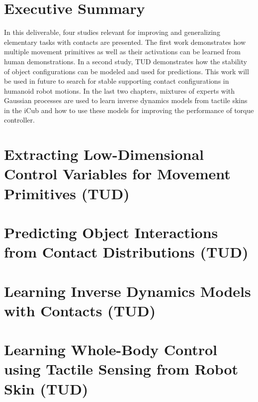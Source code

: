 \documentclass[12pt,a4paper,twoside]{report}
\begin{document}
\chapter{Executive Summary}

In this deliverable, four studies relevant for improving and generalizing
elementary tasks with contacts are presented. The first work demonstrates how
multiple movement primitives as well as their activations can be learned from
human demonstrations. In a second study, TUD demonstrates how the stability of
object configurations can be modeled and used for predictions. This work will be
used in future to search for stable supporting contact configurations in
humanoid robot motions. In the last two chapters, mixtures of experts with
Gaussian processes are used to learn inverse dynamics models from tactile skins
in the iCub and how to use these models for improving the performance of torque
controller.    

%


%


\chapter{Extracting Low-Dimensional Control Variables for Movement Primitives (TUD)}\label{sec:ElmarICRA}


\chapter{Predicting Object Interactions from Contact Distributions (TUD)}\label{sec:OliIROS}


\chapter{Learning Inverse Dynamics Models with Contacts (TUD)}\label{sec:RobertICRA}

% 
\chapter{Learning Whole-Body Control using Tactile Sensing from Robot Skin (TUD)}\label{sec:RobertIROS}




\end{document}
